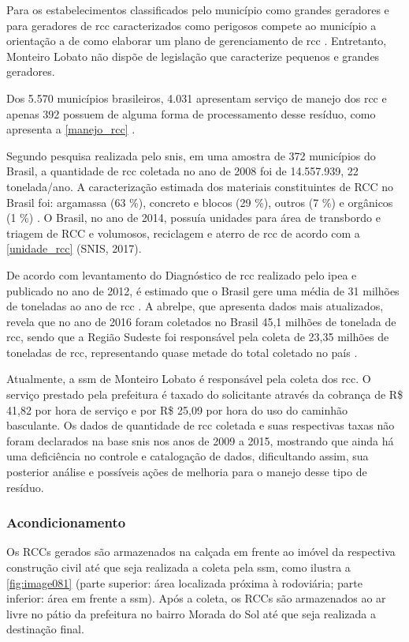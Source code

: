Para os estabelecimentos classificados pelo município como grandes geradores e para geradores de \gls{rcc} caracterizados como perigosos compete ao município a orientação a de como elaborar um plano de gerenciamento de \gls{rcc} \cite{brasil:12305}. Entretanto, Monteiro Lobato não dispõe de legislação que caracterize pequenos e grandes geradores.

Dos 5.570 municípios brasileiros, 4.031 apresentam serviço de manejo dos \gls{rcc} e apenas 392 possuem de alguma forma de processamento desse resíduo, como apresenta a \autoref{manejo_rcc} \cite{IPEA2012b}. 



Segundo pesquisa realizada pelo \gls{snis}, em uma amostra de 372 municípios do Brasil, a quantidade de \gls{rcc} coletada no ano de 2008 foi de 14.557.939, 22 tonelada/ano. A caracterização estimada dos materiais constituintes de RCC no Brasil foi: argamassa (63 \%), concreto e blocos (29 \%), outros (7 \%) e orgânicos (1 \%) \cite{IPEA2012b}. O Brasil, no ano de 2014, possuía unidades para área de transbordo e triagem de RCC e volumosos, reciclagem e aterro de \gls{rcc} de acordo com a \autoref{unidade_rcc} (SNIS, 2017). 



De acordo com levantamento do Diagnóstico de \gls{rcc} realizado pelo \gls{ipea} e publicado no ano de 2012, é estimado que o Brasil gere uma média de 31 milhões de toneladas ao ano de \gls{rcc} \cite{IPEA2012b}. A \gls{abrelpe}, que apresenta dados mais atualizados, revela que no ano de 2016 foram coletados no Brasil 45,1 milhões de tonelada de \gls{rcc}, sendo que a Região Sudeste foi responsável pela coleta de 23,35 milhões de toneladas de \gls{rcc}, representando quase metade do total coletado no país	\cite{abrelpe:2016}.

Atualmente, a \gls{ssm} de Monteiro Lobato é responsável pela coleta dos \gls{rcc}. O serviço prestado pela prefeitura é taxado do solicitante através da cobrança de R\$ 41,82 por hora de serviço e por R\$ 25,09 por hora do uso do caminhão basculante. Os dados de quantidade de \gls{rcc} coletada e suas respectivas taxas não foram declarados na base \gls{snis} nos anos de 2009 a 2015, mostrando que ainda há uma deficiência no controle e catalogação de dados, dificultando assim, sua posterior análise e possíveis ações de melhoria para o manejo desse tipo de resíduo.

\subsubsection{Acondicionamento}
Os RCCs gerados são armazenados na calçada em frente ao imóvel da respectiva construção civil até que seja realizada a coleta pela \gls{ssm}, como ilustra a \autoref{fig:image081} (parte superior: área localizada próxima à rodoviária; parte inferior: área em frente a \gls{ssm}). Após a coleta, os RCCs são armazenados ao ar livre no pátio da prefeitura no bairro Morada do Sol até que seja realizada a destinação final.

